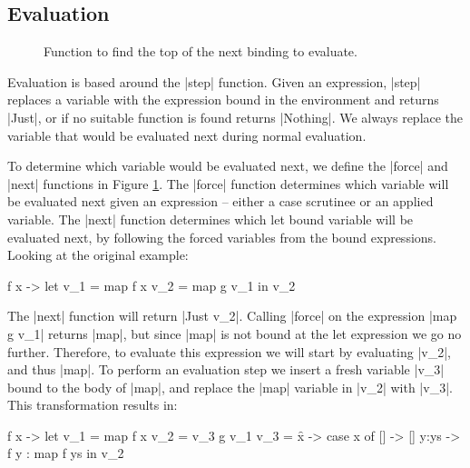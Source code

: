 \documentclass[draft]{sigplanconf}
\begin{document}
\subsection{Evaluation}
\label{sec:eval}

\begin{figure}
\caption{Function to find the top of the next binding to evaluate.}
\label{fig:stack}
\end{figure}

Evaluation is based around the |step| function. Given an expression, |step| replaces a variable with the expression bound in the environment and returns |Just|, or if no suitable function is found returns |Nothing|. We always replace the variable that would be evaluated next during normal evaluation.

To determine which variable would be evaluated next, we define the |force| and |next| functions in Figure \ref{fig:stack}. The |force| function determines which variable will be evaluated next given an expression -- either a case scrutinee or an applied variable. The |next| function determines which let bound variable will be evaluated next, by following the forced variables from the bound expressions. Looking at the original example:

\begin{code}
\g f x ->  let  v_1 =  map f x
                v_2 =  map g v_1
           in   v_2
\end{code}

The |next| function will return |Just v_2|. Calling |force| on the expression |map g v_1| returns |map|, but since |map| is not bound at the let expression we go no further. Therefore, to evaluate this expression we will start by evaluating |v_2|, and thus |map|. To perform an evaluation step we insert a fresh variable |v_3| bound to the body of |map|, and replace the |map| variable in |v_2| with |v_3|. This transformation results in:

\begin{code}
\g f x ->  let  v_1 =  map f x
                v_2 =  v_3 g v_1
                v_3 =  \f x -> case  x of
                                     []    -> []
                                     y:ys  -> f y : map f ys
           in   v_2
\end{code}
\end{document}
